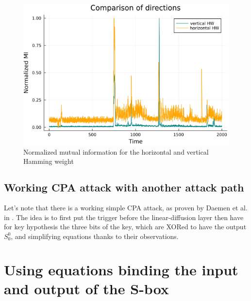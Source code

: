 \documentclass[11pt,technote]{IEEEtran}
\begin{document}
		\begin{figure}[h]
			\centering
			\includegraphics[scale=0.4]{img_files/h_and_v_one_byte}
			\caption{Normalized mutual information for the horizontal and vertical Hamming weight}
			\label{hvval}
		\end{figure}
		
		\subsection{Working CPA attack with another attack path}
		Let's note that there is a working simple CPA attack, as proven by Daemen et al. in \cite{cpa_lin}. The idea is to first put the trigger before the linear-diffusion layer then have for key hypothesis the three bits of the key, which are XORed to have the output $S_0^0$, and simplifying equations thanks to their observations.
%		
%		
%		
		
		\section{Using equations binding the input and output of the S-box}
\end{document}
